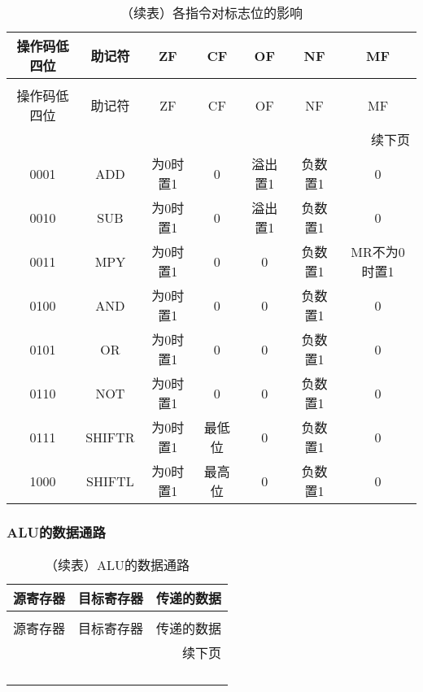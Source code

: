 \documentclass[lang=cn,a4paper,newtx]{elegantpaper}
\begin{document}
\begin{longtable}{c c c c c c c}
  \caption{各指令对标志位的影响} \label{tab:ISA:flags} \\
  \toprule
  操作码低四位 & 助记符 & ZF & CF & OF & NF & MF\\
  \midrule
  \endfirsthead
  
  \caption[]{（续表）各指令对标志位的影响} \\
  \toprule
  操作码低四位 & 助记符 & ZF & CF & OF & NF & MF\\
  \midrule
  \endhead
  
  \midrule
  \multicolumn{7}{r}{续下页} \\
  \midrule
  \endfoot
  
  \bottomrule
  \endlastfoot
  
  0001 & ADD     & 为0时置1 & 0 & 溢出置1 & 负数置1 & 0 \\
  0010 & SUB     & 为0时置1 & 0 & 溢出置1 & 负数置1 & 0 \\
  0011 & MPY     & 为0时置1 & 0 & 0 & 负数置1 & MR不为0时置1 \\
  0100 & AND     & 为0时置1 & 0 & 0 & 负数置1 & 0 \\
  0101 & OR      & 为0时置1 & 0 & 0 & 负数置1 & 0 \\
  0110 & NOT     & 为0时置1 & 0 & 0 & 负数置1 & 0 \\
  0111 & SHIFTR  & 为0时置1 & 最低位 & 0 & 负数置1 & 0 \\
  1000 & SHIFTL  & 为0时置1 & 最高位 & 0 & 负数置1 & 0 \\

\end{longtable}

\subsubsection{ALU的数据通路}
\begin{longtable}{c c c}
  \caption{ALU的数据通路} \label{tab:ALU:DataPath} \\
  \toprule
  源寄存器 & 目标寄存器 & 传递的数据 \\ 
  \midrule
  \endfirsthead

  \caption[]{（续表）ALU的数据通路} \\
  \toprule
  源寄存器 & 目标寄存器 & 传递的数据\\
  \midrule
  \endhead

  \midrule
  \multicolumn{3}{r}{续下页} \\
  \midrule
  \endfoot

  \bottomrule
  \endlastfoot

     &              & \\
    &      & \\
    & &  \\
    &  & \\
\end{longtable}
\end{document}
